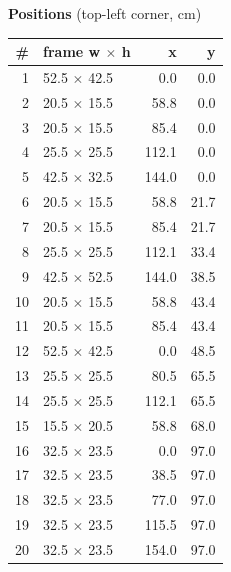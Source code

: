 \documentclass[a4paper,landscape,10pt]{article}
\begin{document}
\begin{minipage}[t]{0.25\textwidth}
\vspace{8pt}
{\bfseries Positions} (top-left corner, cm)\\[2pt]
\tiny
\begin{tabular}{@{}r l r r@{}}
\toprule
\# & frame w $\times$ h & x & y \\
\midrule
1 & 52.5 $\times$ 42.5 & 0.0 & 0.0 \\
2 & 20.5 $\times$ 15.5 & 58.8 & 0.0 \\
3 & 20.5 $\times$ 15.5 & 85.4 & 0.0 \\
4 & 25.5 $\times$ 25.5 & 112.1 & 0.0 \\
5 & 42.5 $\times$ 32.5 & 144.0 & 0.0 \\
6 & 20.5 $\times$ 15.5 & 58.8 & 21.7 \\
7 & 20.5 $\times$ 15.5 & 85.4 & 21.7 \\
8 & 25.5 $\times$ 25.5 & 112.1 & 33.4 \\
9 & 42.5 $\times$ 52.5 & 144.0 & 38.5 \\
10 & 20.5 $\times$ 15.5 & 58.8 & 43.4 \\
11 & 20.5 $\times$ 15.5 & 85.4 & 43.4 \\
12 & 52.5 $\times$ 42.5 & 0.0 & 48.5 \\
13 & 25.5 $\times$ 25.5 & 80.5 & 65.5 \\
14 & 25.5 $\times$ 25.5 & 112.1 & 65.5 \\
15 & 15.5 $\times$ 20.5 & 58.8 & 68.0 \\
16 & 32.5 $\times$ 23.5 & 0.0 & 97.0 \\
17 & 32.5 $\times$ 23.5 & 38.5 & 97.0 \\
18 & 32.5 $\times$ 23.5 & 77.0 & 97.0 \\
19 & 32.5 $\times$ 23.5 & 115.5 & 97.0 \\
20 & 32.5 $\times$ 23.5 & 154.0 & 97.0 \\
\bottomrule
\end{tabular}
\end{minipage}
\clearpage
\end{document}
